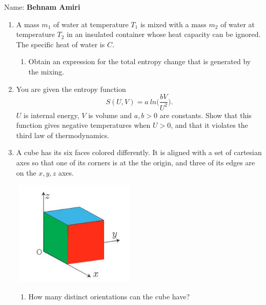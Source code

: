\documentclass[fleqn]{article}
\begin{document}
  Name: \textbf{Behnam Amiri}

  \vspace{1cm}

  \begin{enumerate}
    \item A mass $m_1$ of water at temperature $T_1$ is mixed with a mass $m_2$ of water at temperature $T_2$
    in an insulated container whose heat capacity can be ignored. The specific heat of water is $C$.

    \begin{enumerate}
      \item Obtain an expression for the total entropy change that is generated by the mixing.


    \end{enumerate}

    \item You are given the entropy function
    $$
      S(U, V)=a ~ ln \bigg( \dfrac{bV}{U^2} \bigg).
    $$
    $U$ is internal energy, $V$ is volume and $a, b > 0$ are constants. Show that this function gives
    negative temperatures when $U > 0$, and that it violates the third law of thermodynamics.


    \item A cube has its six faces colored differently. It is aligned with a set of cartesian axes so that
    one of its corners is at the the origin, and three of its edges are on the $x, y, z$ axes.

    \begin{center}
      \includegraphics[height=5cm, width=6cm]{1.JPG}
    \end{center}

    \begin{enumerate}
      \item How many distinct orientations can the cube have?


\end{enumerate}
\end{enumerate}
\end{document}
